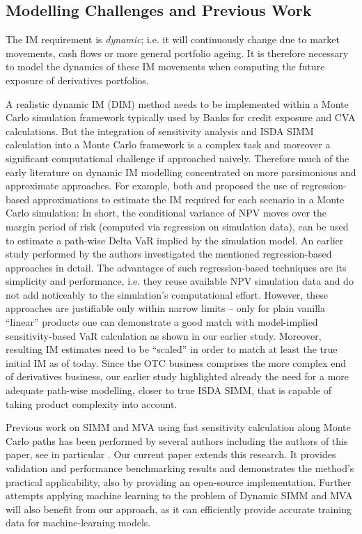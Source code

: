 \documentclass[11pt,a4paper,oneside]{article}
\begin{document}
\subsection*{Modelling Challenges and Previous Work} \label{sec:introchallenges}

The IM requirement is \emph{dynamic}; i.e. it will continuously change due to market movements, cash flows
or more  general portfolio ageing. It is therefore necessary to model the dynamics of these IM movements when computing the future
exposure of derivatives portfolios. 

A realistic dynamic IM (DIM) method needs to be implemented within a Monte Carlo simulation framework typically used
by Banks for credit exposure and CVA calculations. But the integration of sensitivity analysis
and ISDA SIMM calculation into a Monte Carlo framework is a complex task and moreover a significant computational challenge
if approached naively.
Therefore much of the early literature on dynamic IM modelling concentrated on more parsimonious and approximate
approaches. For example, both \cite{PykhtinDIM-2} and \cite{FabrizioAnfusoDIM-2} proposed the use of regression-based
approximations to estimate the IM required for each scenario in a Monte Carlo simulation:
In short, the conditional variance of NPV moves over the margin period of risk (computed via regression on simulation data),
can be used to estimate a path-wise Delta VaR implied by the simulation model.
An earlier study performed by the authors \cite{Caspers2017} investigated the mentioned regression-based approaches in detail.
The advantages of such regression-based techniques are its simplicity and performance, i.e. they reuse available NPV simulation
data and do not add noticeably to the simulation's computational effort.
However, these approaches are justifiable only within narrow limits -- only for plain vanilla ``linear'' products one can
demonstrate a good match with model-implied sensitivity-based VaR calculation as shown in our earlier study.
Moreover, resulting IM estimates need to be ``scaled'' in order to match at least the true initial IM as of today.
Since the OTC business comprises the more complex end of derivatives business,
our earlier study highlighted already the need for a more adequate path-wise modelling,
closer to true ISDA SIMM, that is capable of taking product complexity into account. 

Previous work on SIMM and MVA using fast sensitivity calculation along Monte Carlo paths has been performed by several authors
including the authors of this paper, see in particular \cite{fries_2017, caspers_2018, antonov_2017, jain_2017, lakhani_2021, zeron_2021}.
Our current paper extends this research. It provides validation and performance benchmarking results and demonstrates the method's
practical applicability, also by providing an open-source implementation. 
Further attempts applying machine learning to the problem of Dynamic SIMM and MVA \cite{aryan_2020, villarino_2024}
will also benefit from our approach, as it can efficiently provide accurate training data for machine-learning models. 
\end{document}
